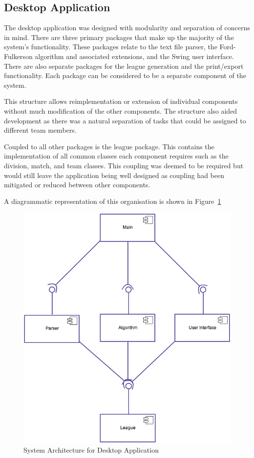 \subsection{Desktop Application}

The desktop application was designed with modularity and separation of concerns
in mind. There are three primary packages that make up the majority of the 
system's functionality. These packages relate to the text file parser,
the Ford-Fulkerson algorithm and associated extensions, and the Swing user
interface. There are also separate packages for the league generation and the 
print/export functionality. Each package can be considered to be a separate
component of the system.

This structure allows reimplementation or extension of individual components 
without much modification of the other components. The structure also aided
development as there was a natural separation of tasks that could be assigned
to different team members.

Coupled to all other packages is the league package. This contains the
implementation of all common classes each component requires such as the
division, match, and team classes. This coupling was deemed to be required
but would still leave the application being well designed as coupling had been
mitigated or reduced between other components.

A diagrammatic representation of this organisation is shown in
Figure~\ref{fig:sysArch}

\begin{figure}
\includegraphics[width=\linewidth,keepaspectratio]{images/DesktopApplicationSystemArchitecture.png}
\caption{System Architecture for Desktop Application}
\label{fig:sysArch}
\end{figure}
